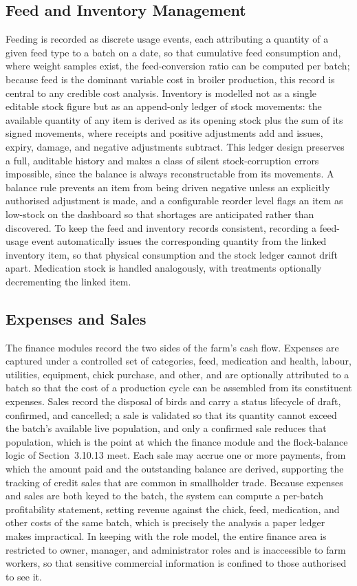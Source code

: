 \documentclass[12pt,a4paper]{report}
\begin{document}
\subsection{Feed and Inventory Management}

Feeding is recorded as discrete usage events, each attributing a quantity of a given feed type to a batch on a date, so that cumulative feed consumption and, where weight samples exist, the feed-conversion ratio can be computed per batch; because feed is the dominant variable cost in broiler production, this record is central to any credible cost analysis. Inventory is modelled not as a single editable stock figure but as an append-only ledger of stock movements: the available quantity of any item is derived as its opening stock plus the sum of its signed movements, where receipts and positive adjustments add and issues, expiry, damage, and negative adjustments subtract. This ledger design preserves a full, auditable history and makes a class of silent stock-corruption errors impossible, since the balance is always reconstructable from its movements. A balance rule prevents an item from being driven negative unless an explicitly authorised adjustment is made, and a configurable reorder level flags an item as low-stock on the dashboard so that shortages are anticipated rather than discovered. To keep the feed and inventory records consistent, recording a feed-usage event automatically issues the corresponding quantity from the linked inventory item, so that physical consumption and the stock ledger cannot drift apart. Medication stock is handled analogously, with treatments optionally decrementing the linked item.

\subsection{Expenses and Sales}

The finance modules record the two sides of the farm's cash flow. Expenses are captured under a controlled set of categories, feed, medication and health, labour, utilities, equipment, chick purchase, and other, and are optionally attributed to a batch so that the cost of a production cycle can be assembled from its constituent expenses. Sales record the disposal of birds and carry a status lifecycle of draft, confirmed, and cancelled; a sale is validated so that its quantity cannot exceed the batch's available live population, and only a confirmed sale reduces that population, which is the point at which the finance module and the flock-balance logic of Section~3.10.13 meet. Each sale may accrue one or more payments, from which the amount paid and the outstanding balance are derived, supporting the tracking of credit sales that are common in smallholder trade. Because expenses and sales are both keyed to the batch, the system can compute a per-batch profitability statement, setting revenue against the chick, feed, medication, and other costs of the same batch, which is precisely the analysis a paper ledger makes impractical. In keeping with the role model, the entire finance area is restricted to owner, manager, and administrator roles and is inaccessible to farm workers, so that sensitive commercial information is confined to those authorised to see it.
\end{document}

